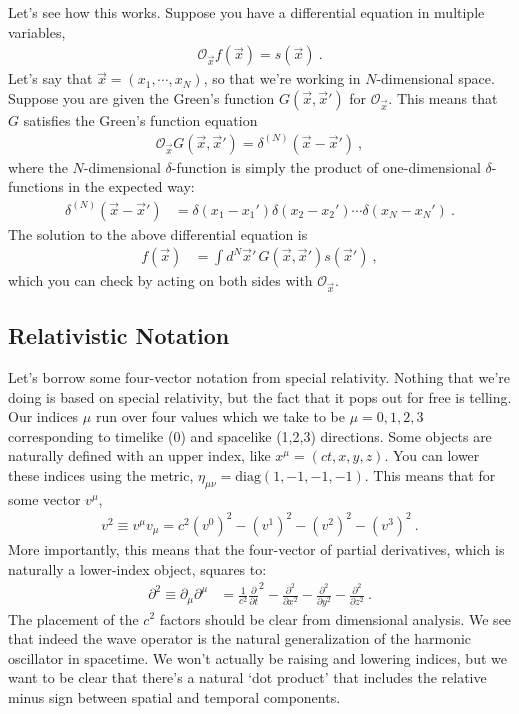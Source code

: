 Let's see how this works. Suppose you have a differential equation in multiple variables,
\begin{align}
	\mathcal O_\vec{x} f(\vec{x}) = s(\vec{x}) \ .
\end{align}
Let's say that $\vec{x}=(x_1, \cdots, x_N)$, so that we're working in $N$-dimensional space. Suppose you are given the Green's function $G(\vec{x},\vec{x}')$ for $\mathcal O_\vec{x}$. This means that $G$ satisfies the Green's function equation
\begin{align}
	\mathcal O_\vec{x} G(\vec{x},\vec{x}') = \delta^{(N)}(\vec{x}-\vec{x}') \ ,
\end{align}
where the $N$-dimensional $\delta$-function is simply the product of one-dimensional $\delta$-functions in the expected way:
\begin{align}
	\delta^{(N)}(\vec{x}-\vec{x}') 
	&=
	\delta(x_1-x_1')\delta(x_2-x_2')\cdots\delta(x_N-x_N') \ .
\end{align}
The solution to the above differential equation is
\begin{align}
	f(\vec{x}) &= \int d^N\vec{x}'\,  G(\vec{x},\vec{x}') s(\vec{x}') \ ,
\end{align}
which you can check by acting on both sides with $\mathcal O_\vec{x}$.

\subsection{Relativistic Notation}

Let's borrow some four-vector notation from special relativity. Nothing that we're doing is based on special relativity, but the fact that it pops out for free is telling. Our indices $\mu$ run over four values which we take to be $\mu = 0,1,2,3$ corresponding to timelike (0) and spacelike (1,2,3) directions. Some objects are naturally defined with an upper index, like $x^\mu = (ct,x,y,z)$. You can lower these indices using the metric, $\eta_{\mu\nu}=\text{diag}(1,-1,-1,-1)$. This means that for some vector $v^\mu$,
\begin{align}
 	v^2 \equiv v^\mu v_\mu 
 	= c^2(v^0)^2 - (v^1)^2 - (v^2)^2 - (v^3)^2 \ .
 \end{align}
 More importantly, this means that the four-vector of partial derivatives, which is naturally a lower-index object, squares to:
 \begin{align}
	 \partial^2\equiv
 	\partial_\mu \partial^\mu 
 	&= 
 	\frac{1}{c^2}
			\frac{\partial}{\partial t}^2
			-
			\frac{\partial^2}
			{\partial x^2}
			-
			\frac{\partial^2}
			{\partial y^2}
			-
			\frac{\partial^2}
			{\partial z^2} \ .
 \end{align}
The placement of the $c^2$ factors should be clear from dimensional analysis. We see that indeed the wave operator is the natural generalization of the harmonic oscillator in spacetime. We won't actually be raising and lowering indices, but we want to be clear that there's a natural `dot product' that includes the relative minus sign between spatial and temporal components.

